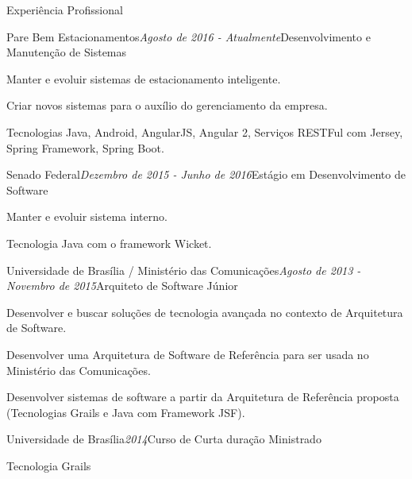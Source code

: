 \documentclass{resume} %
\begin{document}
\begin{rSection}{Experiência Profissional}

\begin{rSubsection}{Pare Bem Estacionamentos}{\em Agosto de 2016 - Atualmente}{Desenvolvimento e Manutenção de Sistemas}{}
\item Manter e evoluir sistemas de estacionamento inteligente.
\item Criar novos sistemas para o auxílio do gerenciamento da empresa.
\item Tecnologias Java, Android, AngularJS, Angular 2, Serviços RESTFul com Jersey, Spring Framework, Spring Boot.
\end{rSubsection}

\begin{rSubsection}{Senado Federal}{\em Dezembro de 2015 - Junho de 2016}{Estágio em Desenvolvimento de Software}{}
\item Manter e evoluir sistema interno.
\item Tecnologia Java com o framework Wicket.
\end{rSubsection}

\begin{rSubsection}{Universidade de Brasília / Ministério das Comunicações}{\em Agosto de 2013 - Novembro de 2015}{Arquiteto de Software Júnior}{}
\item Desenvolver e buscar soluções de tecnologia avançada no contexto de Arquitetura de
Software.
\item Desenvolver uma Arquitetura de Software de Referência para ser usada no Ministério
das Comunicações.
\item Desenvolver sistemas de software a partir da Arquitetura de Referência proposta (Tecnologias Grails e Java com Framework JSF).
\end{rSubsection}


\begin{rSubsection}{Universidade de Brasília}{\em 2014}{Curso de Curta duração Ministrado}{}
\item Tecnologia Grails
\end{rSubsection}

\end{rSection}

\end{document}
